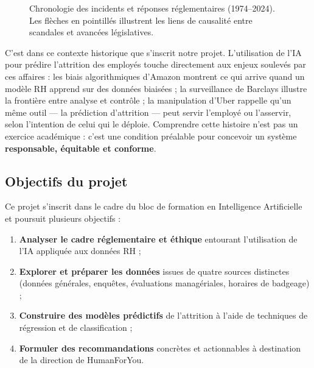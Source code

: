 \documentclass[12pt,a4paper]{article}
\begin{document}
\begin{figure}[ht]
\caption{Chronologie des incidents et réponses réglementaires (1974--2024). Les flèches en pointillés illustrent les liens de causalité entre scandales et avancées législatives.}
\label{fig:chronologie}
\end{figure}

C'est dans ce contexte historique que s'inscrit notre projet. L'utilisation de l'IA pour prédire l'attrition des employés touche directement aux enjeux soulevés par ces affaires : les biais algorithmiques d'Amazon montrent ce qui arrive quand un modèle RH apprend sur des données biaisées ; la surveillance de Barclays illustre la frontière entre analyse et contrôle ; la manipulation d'Uber rappelle qu'un même outil --- la prédiction d'attrition --- peut servir l'employé ou l'asservir, selon l'intention de celui qui le déploie. Comprendre cette histoire n'est pas un exercice académique : c'est une condition préalable pour concevoir un système \textbf{responsable, équitable et conforme}.

\subsection{Objectifs du projet}

Ce projet s'inscrit dans le cadre du bloc de formation en Intelligence Artificielle et poursuit plusieurs objectifs :
\begin{enumerate}
    \item \textbf{Analyser le cadre réglementaire et éthique} entourant l'utilisation de l'IA appliquée aux données RH ;
    \item \textbf{Explorer et préparer les données} issues de quatre sources distinctes (données générales, enquêtes, évaluations managériales, horaires de badgeage) ;
    \item \textbf{Construire des modèles prédictifs} de l'attrition à l'aide de techniques de régression et de classification ;
    \item \textbf{Formuler des recommandations} concrètes et actionnables à destination de la direction de HumanForYou.
\end{enumerate}
\end{document}
